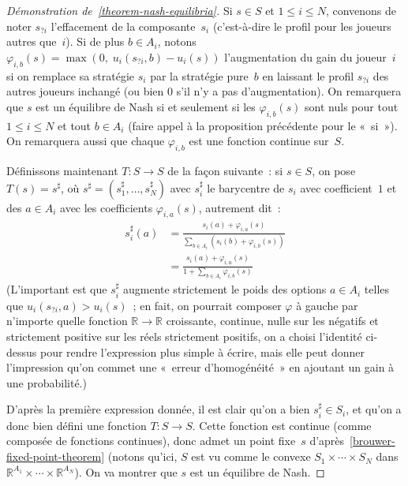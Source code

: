 \documentclass[12pt,a4paper]{article}
\theoremstyle{definition}
\begin{document}
\begin{proof}[Démonstration de \ref{theorem-nash-equilibria}]
Si $s \in S$ et $1\leq i\leq N$, convenons de noter $s_{?i}$
l'effacement de la composante $s_i$ (c'est-à-dire le profil pour les
joueurs autres que $i$).  Si de plus $b \in A_i$, notons
$\varphi_{i,b}(s) = \max(0,\; u_i(s_{?i},b) - u_i(s))$ l'augmentation
du gain du joueur $i$ si on remplace sa stratégie $s_i$ par la
stratégie pure $b$ en laissant le profil $s_{?i}$ des autres joueurs
inchangé (ou bien $0$ s'il n'y a pas d'augmentation).  On remarquera
que $s$ est un équilibre de Nash si et seulement si les
$\varphi_{i,b}(s)$ sont nuls pour tout $1\leq i\leq N$ et tout $b\in
A_i$ (faire appel à la proposition précédente pour le « si »).  On
remarquera aussi que chaque $\varphi_{i,b}$ est une fonction continue
sur $S$.

Définissons maintenant $T\colon S\to S$ de la façon suivante : si $s
\in S$, on pose $T(s) = s^\sharp$, où $s^\sharp =
(s^\sharp_1,\ldots,s^\sharp_N)$ avec $s^\sharp_i$ le barycentre de
$s_i$ avec coefficient $1$ et des $a \in A_i$ avec les coefficients
$\varphi_{i,a}(s)$, autrement dit :
\[
\begin{aligned}
s^\sharp_i(a) &= \frac{s_i(a) + \varphi_{i,a}(s)}{\sum_{b\in A_i}(s_i(b) + \varphi_{i,b}(s))}\\
&= \frac{s_i(a) + \varphi_{i,a}(s)}{1 + \sum_{b\in A_i}\varphi_{i,b}(s)}
\end{aligned}
\]
(L'important est que $s^\sharp_i$ augmente strictement le poids des options
$a\in A_i$ telles que $u_i(s_{?i},a) > u_i(s)$ ; en fait, on pourrait
composer $\varphi$ à gauche par n'importe quelle fonction $\mathbb{R}
\to \mathbb{R}$ croissante, continue, nulle sur les négatifs et
strictement positive sur les réels strictement positifs, on a choisi
l'identité ci-dessus pour rendre l'expression plus simple à écrire,
mais elle peut donner l'impression qu'on commet une « erreur
  d'homogénéité » en ajoutant un gain à une probabilité.)

D'après la première expression donnée, il est clair qu'on a bien
$s^\sharp_i \in S_i$, et qu'on a donc bien défini une fonction
$T\colon S\to S$.  Cette fonction est continue (comme composée de
fonctions continues), donc admet un point fixe $s$
d'après \ref{brouwer-fixed-point-theorem} (notons qu'ici, $S$ est vu
comme le convexe $S_1\times\cdots\times S_N$ dans
$\mathbb{R}^{A_1}\times\cdots\times \mathbb{R}^{A_N}$).  On va montrer
que $s$ est un équilibre de Nash.


\end{proof}
\end{document}
